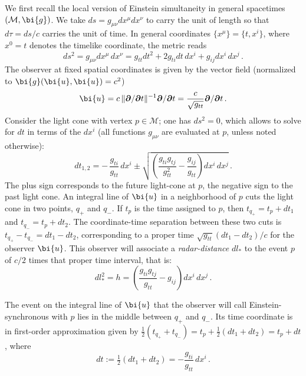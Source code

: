 \documentclass
[rmp,aps,twocolumn,showpacs,preprintnumbers,amsmath,amssymb]{revtex4}
\theoremstyle{plain}
\theoremstyle{definition}
\theoremstyle{remark}
\newcommand{\norm}[1]{\lVert#1\rVert}         %
\newcommand{\bpartial}{\boldsymbol{\partial}} %
\newcommand{\M}{\mathcal{M}}                      %
\newcommand{\g}{\bg}                            %
\newcommand{\bg}{\bi{g}}
\newcommand{\bu}{\bi{u}}
\begin{document}
We first recall the local version of Einstein simultaneity in 
general spacetimes $(\M,\g)$. We take $ds=g_{\mu\nu}dx^\mu dx^\nu$ 
to carry the unit of length so that $d\tau=ds/c$ carries the 
unit of time. In general coordinates $\{x^\mu\}=\{t,x^i\}$, where $x^0=t$ 
denotes the timelike coordinate, the metric reads 
%
\begin{equation}\label{eq:MetricGen}
  ds^2 = g_{\mu\nu}dx^\mu\,dx^\nu
       = g_{tt}dt^2 + 2g_{ti}dt\,dx^i + g_{ij}dx^i\,dx^j\,.
\end{equation}
%
The observer at fixed spatial coordinates is given by the vector 
field (normalized to $\g(\bu,\bu)=c^2$)
%
\begin{equation}  \label{eq:observer}
  \bu = c\,\norm{\bpartial/\bpartial t}^{-1} \bpartial/\bpartial t
      = \frac{c}{\sqrt{g_{tt}}} \bpartial/\bpartial t \,.
\end{equation}
%
Consider the light cone with vertex $p\in\M$; one has $ds^2=0$, which 
allows to solve for $dt$ in terms of the $dx^i$ (all functions $g_{\mu\nu}$
are evaluated at $p$, unless noted otherwise): 
%
\begin{equation}\label{eq:LightConeDiff}
  dt_{1{,}2} = -\,\frac{g_{ti}}{g_{tt}}\,dx^i \pm 
  \sqrt{\left( \frac{g_{ti}g_{tj}}{g^2_{tt}}-\frac{g_{ij}}{g_{tt}} \right)
  dx^i\,dx^j}\,.
\end{equation}
%
The plus sign corresponds to the future light-cone at $p$, 
the negative sign to the past light cone. An integral line of $\bu$ 
in a neighborhood of $p$ cuts the light cone in two points,
$q_+$ and $q_-$. If $t_p$ is the time assigned to $p$, then 
$t_{q_+}=t_p+dt_1$ and $t_{q_-}=t_p+dt_2$. The coordinate-time 
separation between these two cuts is $t_{q_+}-t_{q_-}=dt_1-dt_2$,
corresponding to a proper time $\sqrt{g_{tt}}(dt_1-dt_2)/c$ for 
the observer $\bu$. This observer will associate 
a \emph{radar-distance} $dl_*$ to the event $p$ of $c/2$ times that 
proper time interval, that is: 
%
\begin{equation}\label{eq:RadarDist}
  dl_*^2 = h =
  \left(\frac{g_{ti}g_{tj}}{g_{tt}} - g_{ij}\right) dx^i\,dx^j\,.
\end{equation}
%

The event on the integral line of $\bu$ that the observer will 
call Einstein-synchronous with $p$ lies in the middle between 
$q_+$ and $q_-$. Its time coordinate is in first-order approximation 
given by $\tfrac{1}{2}(t_{q_+}+t_{q_-})=t_p+\tfrac{1}{2}(dt_1+dt_2)=t_p+dt$,
where  
%
\begin{equation}\label{eq:EinstSynShift}
  dt := \tfrac{1}{2}(dt_1+dt_2) = -\frac{g_{ti}}{g_{tt}}\,dx^i\,.
\end{equation}
%
\end{document}
